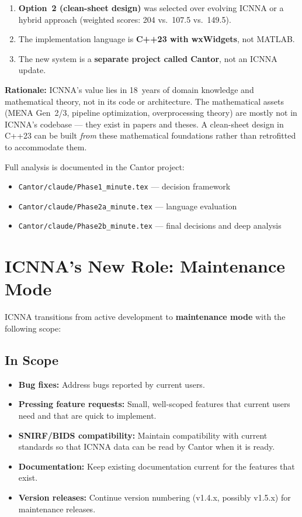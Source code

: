 \documentclass[11pt,a4paper]{article}
\begin{document}
\begin{enumerate}
    \item \textbf{Option~2 (clean-sheet design)} was selected over evolving ICNNA or a hybrid approach (weighted scores: 204 vs.\ 107.5 vs.\ 149.5).
    \item The implementation language is \textbf{C++23 with wxWidgets}, not MATLAB.
    \item The new system is a \textbf{separate project called Cantor}, not an ICNNA update.
\end{enumerate}

\textbf{Rationale:} ICNNA's value lies in 18~years of domain knowledge and mathematical theory, not in its code or architecture. The mathematical assets (MENA Gen~2/3, pipeline optimization, overprocessing theory) are mostly not in ICNNA's codebase --- they exist in papers and theses. A clean-sheet design in C++23 can be built \emph{from} these mathematical foundations rather than retrofitted to accommodate them.

Full analysis is documented in the Cantor project:
\begin{itemize}
    \item \texttt{Cantor/claude/Phase1\_minute.tex} --- decision framework
    \item \texttt{Cantor/claude/Phase2a\_minute.tex} --- language evaluation
    \item \texttt{Cantor/claude/Phase2b\_minute.tex} --- final decisions and deep analysis
\end{itemize}

\section{ICNNA's New Role: Maintenance Mode}

ICNNA transitions from active development to \textbf{maintenance mode} with the following scope:

\subsection{In Scope}
\begin{itemize}
    \item \textbf{Bug fixes:} Address bugs reported by current users.
    \item \textbf{Pressing feature requests:} Small, well-scoped features that current users need and that are quick to implement.
    \item \textbf{SNIRF/BIDS compatibility:} Maintain compatibility with current standards so that ICNNA data can be read by Cantor when it is ready.
    \item \textbf{Documentation:} Keep existing documentation current for the features that exist.
    \item \textbf{Version releases:} Continue version numbering (v1.4.x, possibly v1.5.x) for maintenance releases.
\end{itemize}
\end{document}
